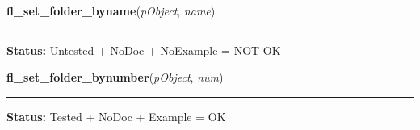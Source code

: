     \label{xformslib:library:fl_set_folder_byname}

    \vspace{0.5ex}

\hspace{.8\funcindent}\begin{boxedminipage}{\funcwidth}

    \raggedright \textbf{fl\_set\_folder\_byname}(\textit{pObject}, \textit{name})

    \vspace{-1.5ex}

    \rule{\textwidth}{0.5\fboxrule}
\setlength{\parskip}{2ex}
\setlength{\parskip}{1ex}
\textbf{Status:} Untested + NoDoc + NoExample = NOT OK



    \end{boxedminipage}

    \label{xformslib:library:fl_set_folder_bynumber}

    \vspace{0.5ex}

\hspace{.8\funcindent}\begin{boxedminipage}{\funcwidth}

    \raggedright \textbf{fl\_set\_folder\_bynumber}(\textit{pObject}, \textit{num})

    \vspace{-1.5ex}

    \rule{\textwidth}{0.5\fboxrule}
\setlength{\parskip}{2ex}
\setlength{\parskip}{1ex}
\textbf{Status:} Tested + NoDoc + Example = OK



    \end{boxedminipage}

    \label{xformslib:library:fl_get_folder}

    \vspace{0.5ex}

